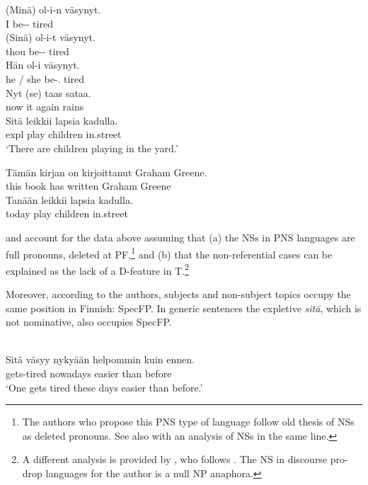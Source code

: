 \documentclass[output=paper]{langsci/langscibook}
\begin{document}
\ea%
    \label{ex:key:26.36}
    \ea
	\gll    (Minä) ol-i-n       väsynyt.\\
            \hphantom{(}I        be-\Pst-\Fsg{}   tired\\
    \ex
    \gll    (Sinä) ol-i-t           väsynyt.\\
            \hphantom{(}thou be-\Pst-\Ssg{}    tired\\
    \ex \gll    Hän ol-i väsynyt.\\
    {he / she} be-\Pst{}.\Tsg{} tired\\
    \ex
    \gll    Nyt (se) taas sataa.\\
    now \hphantom{(}it again rains\\
    \ex
    \gll	Sitä leikkii lapsia kadulla.\\
    expl play    children  in.street\\
    \glt
    \enquote*{There are children
    playing in the yard.}
    \z
\z

\ea%
    \label{ex:key:26.37}
    \ea
	\gll	Tämän kirjan on kirjoittanut Graham Greene.\\
			this      book has  written      Graham Greene\\
    \ex
	\gll	Tanään   leikkii  lapsia     kadulla.\\
			today    play    children  in.street\\
    \z
\z

\citet{HolmbergNayuduSheehan2009} and \citet{HolShee2010} account for the data
above assuming that (a) the NSs in \gls{PNS} languages are full pronouns,
deleted at \gls{PF},\footnote{The authors who propose this
    \gls{PNS} type of language follow  old thesis of
NSs as deleted pronouns.  See also \citet{Roberts2010c} with an analysis of NSs
in the same line.} and (b) that the non-referential cases can be explained as
the lack of a D-feature in T.\footnote{A different analysis is provided by
\citet{Barbosa2013}, who follows \citet{Tomioka2003}. The NS in discourse
pro-drop languages for the author is a null NP anaphora.}

Moreover, according to the authors, subjects and non-subject topics occupy the
same position in Finnish: SpecFP. In generic sentences the expletive
\emph{sitä}, which is not nominative, also occupies SpecFP.

\ea%
    \label{ex:key:26.38}\\
	\gll	Sitä väsyy          nykyään helpommin kuin ennen.\\
            \Expl{} gets-tired  nowadays easier       than before\\
	\glt	\enquote*{One gets tired these days easier than before.}
\z
\end{document}
